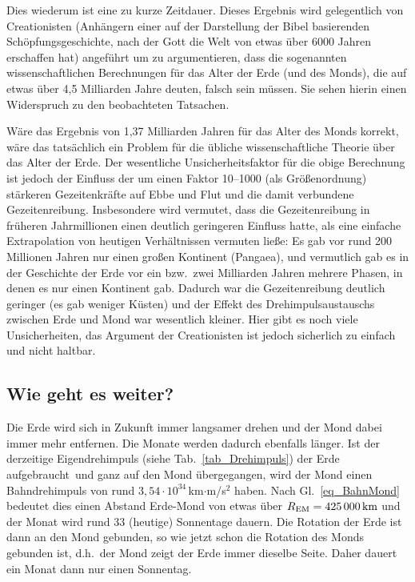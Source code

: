 Dies wiederum ist eine zu kurze Zeitdauer. Dieses Ergebnis wird gelegentlich von Creationisten
(Anh\"angern einer auf der Darstellung der Bibel basierenden Sch\"opfungsgeschichte, nach der
Gott die Welt von etwas \"uber 6000 Jahren erschaffen hat) angef\"uhrt um zu argumentieren, dass
die sogenannten wissenschaftlichen Berechnungen f\"ur das Alter der Erde (und des Monds), die 
auf etwas \"uber 4,5 Milliarden Jahre deuten, falsch sein m\"ussen. 
Sie sehen hierin einen Widerspruch zu den beobachteten Tatsachen.

W\"are das Ergebnis von 1,37 Milliarden Jahren f\"ur das Alter des Monds korrekt, w\"are das
tats\"achlich ein Problem f\"ur die \"ubliche wissenschaftliche Theorie \"uber das Alter der Erde.
Der wesentliche Unsicherheitsfaktor f\"ur die obige Berechnung ist jedoch der Einfluss der um einen
Faktor 10--1000 (als Gr\"o\ss enordnung) st\"arkeren Gezeitenkr\"afte auf Ebbe und Flut und die 
damit verbundene Gezeitenreibung. Insbesondere wird vermutet, dass die Gezeitenreibung in
fr\"uheren Jahrmillionen einen deutlich geringeren Einfluss hatte, als eine einfache Extrapolation
von heutigen Verh\"altnissen vermuten lie\ss e: Es gab vor rund 200 Millionen Jahren nur einen gro\ss en
Kontinent (Pangaea), und vermutlich gab es in der Geschichte der Erde vor ein bzw.\ zwei Milliarden
Jahren mehrere Phasen, in denen es nur einen Kontinent gab. Dadurch war die Gezeitenreibung
deutlich geringer (es gab weniger K\"usten) und der Effekt des Dreh\-impulsaustauschs zwischen Erde
und Mond war wesentlich kleiner. Hier gibt es noch viele Unsicherheiten, das Argument der
Creationisten ist jedoch sicherlich zu einfach und nicht haltbar.

\subsection{Wie geht es weiter?}

Die Erde wird sich in Zukunft immer langsamer drehen und der Mond dabei immer mehr
entfernen. Die Monate werden dadurch ebenfalls l\"anger. Ist der derzeitige Eigendrehimpuls
(siehe Tab.\ \ref{tab_Drehimpuls}) der Erde \glqq aufgebraucht\grqq\ und ganz auf den Mond \"ubergegangen,
wird der Mond einen Bahndrehimpuls von rund $3,54\cdot 10^{34}$\,km$\cdot$m/s${}^2$ haben.
Nach Gl.\ \ref{eq_BahnMond} bedeutet dies einen Abstand Erde-Mond von etwas \"uber 
$R_{\rm EM}=425\,000\,{\rm km}$ und der Monat wird rund 33 (heutige) Sonnentage dauern.   
Die Rotation der Erde ist dann an den Mond gebunden, so wie jetzt schon die Rotation des
Monds gebunden ist, d.h.\ der Mond zeigt der Erde immer dieselbe Seite. Daher dauert ein Monat
dann nur einen Sonnentag. 

